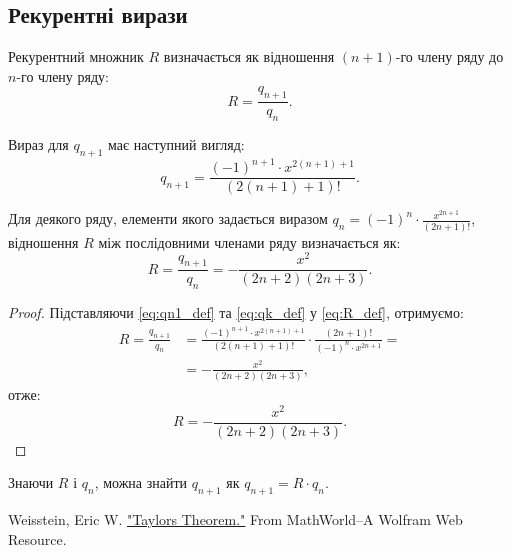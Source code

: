 	\subsection{Рекурентні вирази}
	
	\begin{definition}
		Рекурентний множник \( R \) визначається як відношення \( (n+1) \)-го члену ряду до \( n \)-го члену ряду:
		\begin{equation} \label{eq:R_def}
			R = \frac{q_{n+1}}{q_n}.
		\end{equation}
	\end{definition}
	
	\begin{definition}
		Вираз для \( q_{n+1} \) має наступний вигляд:
		\begin{equation} \label{eq:qn1_def}
			q_{n+1} = \frac{(-1)^{n+1} \cdot x^{2(n+1)+1}}{(2(n+1) + 1)!}.
		\end{equation}
	\end{definition}
	
	\begin{theorem} \label{thm:ratio_test_result}
		Для деякого ряду, елементи якого задається виразом \(q_n = (-1)^n \cdot \frac{x^{2n+1}}{(2n + 1)!}\), відношення \(R\) між послідовними членами ряду визначається як:
		\[
		R = \frac{q_{n+1}}{q_n} = -\frac{x^2}{(2n + 2)(2n + 3)}.
		\]
	\end{theorem}
	
	\begin{proof}
		Підставляючи \eqref{eq:qn1_def} та \eqref{eq:qk_def} у \eqref{eq:R_def}, отримуємо:
		\begin{align*}
			R = \frac{q_{n+1}}{q_n} &= \frac{(-1)^{n+1} \cdot x^{2(n+1)+1}}{(2(n+1) + 1)!} \cdot \frac{(2n + 1)!}{(-1)^n \cdot x^{2n+1}}= \\
			&= -\frac{x^2}{(2n + 2)(2n + 3)},
		\end{align*}
		отже:
		\begin{equation} \label{eq:R_simplified}
			R = -\frac{x^2}{(2n + 2)(2n + 3)}.
		\end{equation}
	\end{proof}
	
	\begin{corollary}
		Знаючи \( R \) і \( q_n \), можна знайти \( q_{n+1} \) як \( q_{n+1} = R \cdot q_n \).
	\end{corollary}
	
	
	
    \begin{thebibliography}{9}

	 \label{weisstein}
	Weisstein, Eric W. \href{https://mathworld.wolfram.com/TaylorsTheorem.html}{"Taylors Theorem."} From MathWorld--A Wolfram Web Resource.
	\end{thebibliography}
	
	
	
